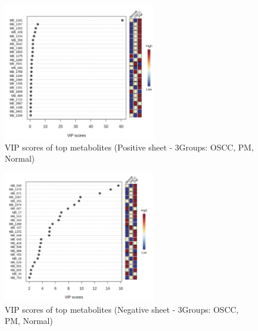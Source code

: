 \documentclass[a4paper,12pt]{article}
\begin{document}
\begin{figure}[H]
	\centering
	\includegraphics[width=0.6\textwidth]{images/3group_positive.png}
	\caption{VIP scores of top metabolites (Positive sheet - 3Groups: OSCC, PM, Normal)}
	\label{fig:vip_positive_3groups}
\end{figure}

\begin{figure}[H]
	\centering
	\includegraphics[width=0.6\textwidth]{images/3group_negative.png}
	\caption{VIP scores of top metabolites (Negative sheet - 3Groups: OSCC, PM, Normal)}
	\label{fig:vip_negative_3groups}
\end{figure}
\end{document}
